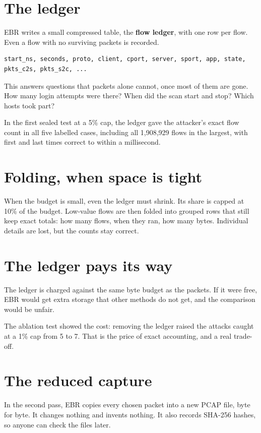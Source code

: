 \section{The ledger}
EBR writes a small compressed table, the \textbf{flow ledger}, with one row per flow. Even a flow with no surviving packets is recorded.

\begin{lstlisting}
start_ns, seconds, proto, client, cport, server, sport, app, state, pkts_c2s, pkts_s2c, ...
\end{lstlisting}

This answers questions that packets alone cannot, once most of them are gone. How many login attempts were there? When did the scan start and stop? Which hosts took part?

\begin{example}
In the first sealed test at a 5\% cap, the ledger gave the attacker's exact flow count in all five labelled cases, including all 1,908,929 flows in the largest, with first and last times correct to within a millisecond.
\end{example}

\section{Folding, when space is tight}
When the budget is small, even the ledger must shrink. Its share is capped at 10\% of the budget. Low-value flows are then folded into grouped rows that still keep exact totals: how many flows, when they ran, how many bytes. Individual details are lost, but the counts stay correct.

\section{The ledger pays its way}
\begin{bigidea}
The ledger is charged against the same byte budget as the packets. If it were free, EBR would get extra storage that other methods do not get, and the comparison would be unfair.
\end{bigidea}

The ablation test showed the cost: removing the ledger raised the attacks caught at a 1\% cap from 5 to 7. That is the price of exact accounting, and a real trade-off.

\section{The reduced capture}
In the second pass, EBR copies every chosen packet into a new PCAP file, byte for byte. It changes nothing and invents nothing. It also records SHA-256 hashes, so anyone can check the files later.

